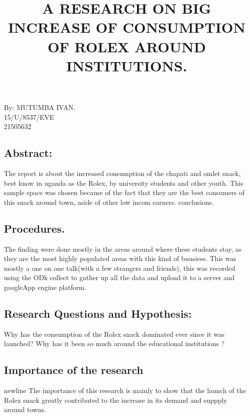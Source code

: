 \documentclass{article}
\title{A RESEARCH ON BIG INCREASE OF CONSUMPTION OF ROLEX AROUND INSTITUTIONS.}
\begin{document}
\begin{titlepage}
\maketitle
\begin{center}
By:
\vspace{5mm}
MUTUMBA IVAN.\\
15/U/8537/EVE\\
\vspace{5mm}
21505632
\end{center}
\end{titlepage}
\newpage
\begin{center}
\section{Abstract:}
\vspace{5mm}
The report is about the increased consumption of the chapati and omlet 
snack, best know in uganda as the Rolex, by university students and other youth.
This sample space was chosen because of the fact that they are the best consumers of this snack around town, aside of other low incom earners.
 conclusions.
\end{center}
\begin{center}
\section{Procedures.}
\vspace{5mm}
The finding were done mostly in the areas around where these students stay, as they are the most highly populated areas with this kind of buusiess.
This was mostly a one on one talk(with a few strangers and friends), this was recorded using the ODk collect to gather up all the data and upload it
to a server and googleApp engine platform.
\end{center}
 \begin{center}
 \section{Research Questions and Hypothesis:}
\vspace{5mm}
Why has the consumption of the Rolex snack dominated ever since it was launched?
\newline Why has it been so much around the educational institutions ?
\subsection{Importance of the research} 
\vspace{3mm}
newline The importance of this research is mainly to show that the launch of the Rolex snack greatly contributed to the increase in its demand and suppply around towns.
\end{center}
\end{document}
